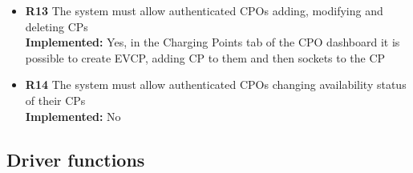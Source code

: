 \begin{itemize}
    \item        \textbf{R13} The system must allow authenticated CPOs adding, modifying and deleting CPs                                                                              \\
          \textbf{Implemented:} Yes, in the Charging Points tab of the CPO dashboard it is possible to create EVCP, adding CP to them and then sockets to the CP
    \item        \textbf{R14} The system must allow authenticated CPOs changing availability status of their CPs                                                                       \\
          \textbf{Implemented:} No
\end{itemize}

\subsection{Driver functions}

